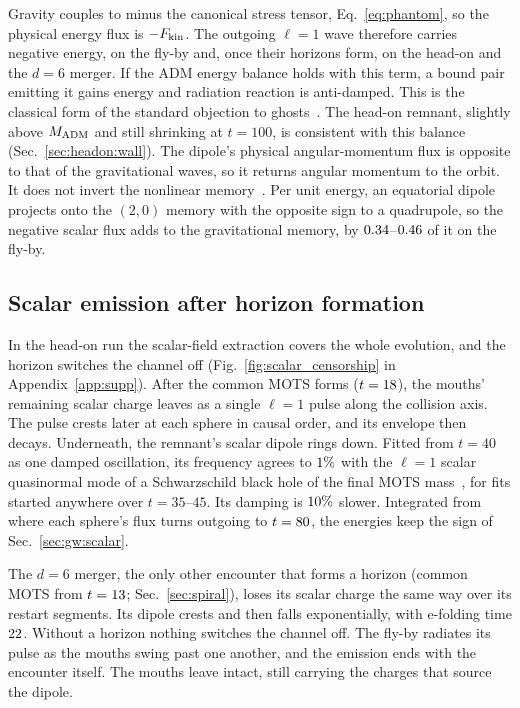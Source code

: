 \documentclass[twocolumn,floatfix,aps,prd,superscriptaddress,nofootinbib]{revtex4-2}
\begin{document}
Gravity couples to minus the canonical stress tensor, Eq.~\eqref{eq:phantom}, so the physical energy flux is $-F_{\rm kin}$. The outgoing $\ell=1$ wave therefore carries negative energy, on the fly-by and, once their horizons form, on the head-on and the $d=6$ merger. If the ADM energy balance holds with this term, a bound pair emitting it gains energy and radiation reaction is anti-damped. This is the classical form of the standard objection to ghosts~\cite{carroll2003,cline2004}. The head-on remnant, slightly above $M_{\rm ADM}$ and still shrinking at $t=100$, is consistent with this balance (Sec.~\ref{sec:headon:wall}). The dipole's physical angular-momentum flux is opposite to that of the gravitational waves, so it returns angular momentum to the orbit. It does not invert the nonlinear memory~\cite{christodoulou1991,thorne1992,favata2009}. Per unit energy, an equatorial dipole projects onto the $(2,0)$ memory with the opposite sign to a quadrupole, so the negative scalar flux adds to the gravitational memory, by $0.34$--$0.46$ of it on the fly-by.

\subsection{Scalar emission after horizon formation}
\label{sec:gw:censorship}

In the head-on run the scalar-field extraction covers the whole evolution, and the horizon switches the channel off (Fig.~\ref{fig:scalar_censorship} in Appendix~\ref{app:supp}). After the common MOTS forms ($t=18$), the mouths' remaining scalar charge leaves as a single $\ell=1$ pulse along the collision axis. The pulse crests later at each sphere in causal order, and its envelope then decays. Underneath, the remnant's scalar dipole rings down. Fitted from $t=40$ as one damped oscillation, its frequency agrees to $1\%$ with the $\ell=1$ scalar quasinormal mode of a Schwarzschild black hole of the final MOTS mass~\cite{berti2009}, for fits started anywhere over $t=35$--$45$. Its damping is $10\%$ slower. Integrated from where each sphere's flux turns outgoing to $t=80$, the energies keep the sign of Sec.~\ref{sec:gw:scalar}.

The $d=6$ merger, the only other encounter that forms a horizon (common MOTS from $t=13$; Sec.~\ref{sec:spiral}), loses its scalar charge the same way over its restart segments. Its dipole crests and then falls exponentially, with e-folding time $22$. Without a horizon nothing switches the channel off. The fly-by radiates its pulse as the mouths swing past one another, and the emission ends with the encounter itself. The mouths leave intact, still carrying the charges that source the dipole.
\end{document}
